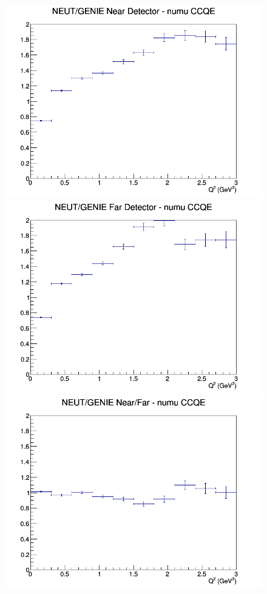 \begin{figure}[h]
\endminipage
\newline
{}
\includegraphics[width=\linewidth]{eff_Q2/GAr/ratios/CCQE_NEUT_GENIE_numu_near_Q2.png}
\endminipage
{}
\includegraphics[width=\linewidth]{eff_Q2/GAr/ratios/CCQE_NEUT_GENIE_numu_far_Q2.png}
\endminipage
{}
\includegraphics[width=\linewidth]{eff_Q2/GAr/ratios/CCQE_NEUT_GENIE_numu_NF_Q2.png}

\end{figure}
